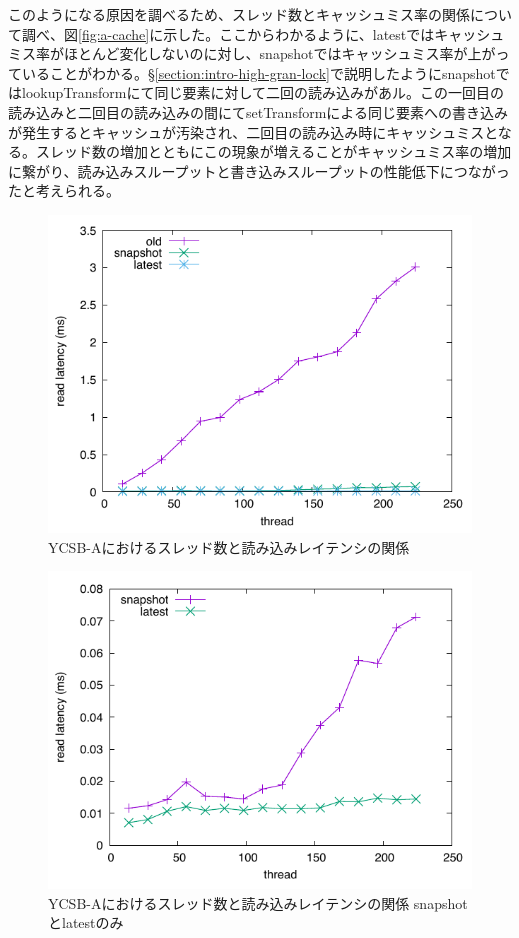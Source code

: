 \documentclass[a4paper]{jreport}	%
\begin{document}
このようになる原因を調べるため、スレッド数とキャッシュミス率の関係について調べ、図\ref{fig:a-cache}に示した。ここからわかるように、latestではキャッシュミス率がほとんど変化しないのに対し、snapshotではキャッシュミス率が上がっていることがわかる。§\ref{section:intro-high-gran-lock}で説明したようにsnapshotではlookupTransformにて同じ要素に対して二回の読み込みがあル。この一回目の読み込みと二回目の読み込みの間にてsetTransformによる同じ要素への書き込みが発生するとキャッシュが汚染され、二回目の読み込み時にキャッシュミスとなる。スレッド数の増加とともにこの現象が増えることがキャッシュミス率の増加に繋がり、読み込みスループットと書き込みスループットの性能低下につながったと考えられる。

\begin{figure}[h] 
\centering
\includegraphics[width=15cm]{ycsb-a/opposite-read-latency}
\caption{YCSB-Aにおけるスレッド数と読み込みレイテンシの関係}
\label{fig:a-read-latency}
\end{figure}

\begin{figure}[h] 
\centering
\includegraphics[width=15cm]{ycsb-a/opposite-read-latency2}
\caption{YCSB-Aにおけるスレッド数と読み込みレイテンシの関係 snapshotとlatestのみ}
\label{fig:a-read-latency2}
\end{figure}
\end{document}
